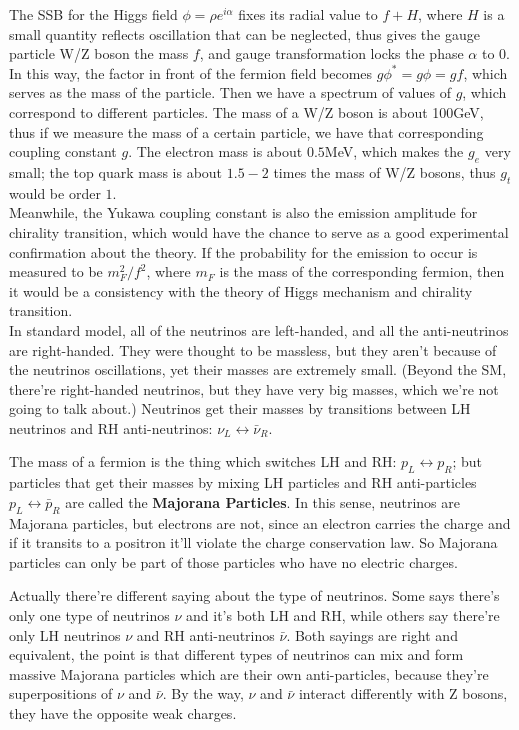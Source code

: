 \documentclass{article}
\renewcommand{\1}{\left}
\renewcommand{\2}{\right}
\newcommand{\n}{\nu}
\newcommand{\al}{\alpha}
\begin{document}
The SSB for the Higgs field $\phi=\rho e^{i\al}$ fixes its radial value to $f+H$, where $H$ is a small quantity reflects oscillation that can be neglected, thus gives the gauge particle W/Z boson the mass $f$, and gauge transformation locks the phase $\al$ to $0$. In this way, the factor in front of the fermion field becomes $g\phi^*=g\phi=gf$, which serves as the mass of the particle. Then we have a spectrum of values of $g$, which correspond to different particles. The mass of a W/Z boson is about 100GeV, thus if we measure the mass of a certain particle, we have that corresponding coupling constant $g$. The electron mass is about $0.5$MeV, which makes the $g_e$ very small; the top quark mass is about $1.5-2$ times the mass of W/Z bosons, thus $g_t$ would be order $1$.\\
Meanwhile, the Yukawa coupling constant is also the emission amplitude for chirality transition, which would have the chance to serve as a good experimental confirmation about the theory. If the probability for the emission to occur is measured to be $m_F^2/f^2$, where $m_F$ is the mass of the corresponding fermion, then it would be a consistency with the theory of Higgs mechanism and chirality transition.\\

In standard model, all of the neutrinos are left-handed, and all the anti-neutrinos are right-handed. They were thought to be massless, but they aren't because of the neutrinos oscillations, yet their masses are extremely small. (Beyond the SM, there're right-handed neutrinos, but they have very big masses, which we're not going to talk about.) Neutrinos get their masses by transitions between LH neutrinos and RH anti-neutrinos: $\n_L\leftrightarrow\bar\n_R$.

The mass of a fermion is the thing which switches LH and RH: $p_L\leftrightarrow p_R$; but particles that get their masses by mixing LH particles and RH anti-particles $p_L\leftrightarrow \bar p_R$ are called the \textbf{Majorana Particles}. In this sense, neutrinos are Majorana particles, but electrons are not, since an electron carries the charge and if it transits to a positron it'll violate the charge conservation law. So Majorana particles can only be  part of those particles who have no electric charges. 

Actually there're different saying about the type of neutrinos. Some says there's only one type of neutrinos $\n$ and it's both LH and RH, while others say there're only LH neutrinos $\n$ and RH anti-neutrinos $\bar\n$. Both sayings are right and equivalent, the point is that different types of neutrinos can mix and form massive Majorana particles which are their own anti-particles, because they're superpositions of $\n$ and $\bar\n$. By the way, $\n$ and $\bar\n$ interact differently with Z bosons, they have the opposite weak charges.\\
\end{document}
